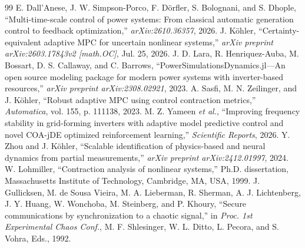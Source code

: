 \documentclass[journal]{IEEEtran}
\begin{document}
\begin{thebibliography}{99}
 E. Dall'Anese, J. W. Simpson-Porco, F. D\"orfler, S. Bolognani, and S. Dhople, ``Multi-time-scale control of power systems: From classical automatic generation control to feedback optimization,'' \textit{arXiv:2610.36357}, 2026.
 J. K\"ohler, ``Certainty-equivalent adaptive MPC for uncertain nonlinear systems,'' \textit{arXiv preprint arXiv:2603.17843v2 [math.OC]}, Jul. 25, 2026.
 J. D. Lara, R. Henriquez-Auba, M. Bossart, D. S. Callaway, and C. Barrows, ``PowerSimulationsDynamics.jl---An open source modeling package for modern power systems with inverter-based resources,'' \textit{arXiv preprint arXiv:2308.02921}, 2023.
 A. Sasfi, M. N. Zeilinger, and J. K\"ohler, ``Robust adaptive MPC using control contraction metrics,'' \textit{Automatica}, vol. 155, p. 111138, 2023.
 M. Z. Yameen \textit{et al.}, ``Improving frequency stability in grid-forming inverters with adaptive model predictive control and novel COA-jDE optimized reinforcement learning,'' \textit{Scientific Reports}, 2026.
 Y. Zhou and J. K\"ohler, ``Scalable identification of physics-based and neural dynamics from partial measurements,'' \textit{arXiv preprint arXiv:2412.01997}, 2024.
 W. Lohmiller, ``Contraction analysis of nonlinear systems,'' Ph.D. dissertation, Massachusetts Institute of Technology, Cambridge, MA, USA, 1999.
 J. Gullicksen, M. de Sousa Vieira, M. A. Lieberman, R. Sherman, A. J. Lichtenberg, J. Y. Huang, W. Wonchoba, M. Steinberg, and P. Khoury, ``Secure communications by synchronization to a chaotic signal,'' in \textit{Proc. 1st Experimental Chaos Conf.}, M. F. Shlesinger, W. L. Ditto, L. Pecora, and S. Vohra, Eds., 1992.
\end{thebibliography}
\end{document}
